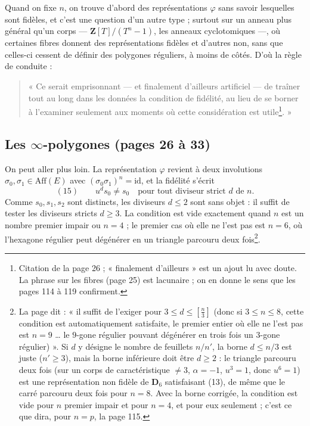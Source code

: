 \documentclass[11pt,a4paper]{article}
\begin{document}
Quand on fixe $n$, on trouve d'abord des représentations $\varphi$ sans savoir
lesquelles sont fidèles, et c'est une question d'un autre type ; surtout sur
un anneau plus général qu'un corps --- $\mathbf{Z}[T]/(T^n - 1)$, les anneaux
cyclotomiques ---, où certaines fibres donnent des représentations fidèles et
d'autres non, sans que celles-ci cessent de définir des polygones réguliers,
à moins de côtés. D'où la règle de conduite :
\begin{quote}
« Ce serait emprisonnant --- et finalement d'ailleurs artificiel --- de
traîner tout au long dans les données la condition de fidélité, au lieu de se
borner à l'examiner seulement aux moments où cette considération est
utile\footnote{Citation de la page 26 ; « finalement d'ailleurs » est un
ajout lu avec doute. La phrase sur les fibres (page 25) est lacunaire ; on en
donne le sens que les pages 114 à 119 confirment.}. »
\end{quote}

\subsection*{Les $\infty$-polygones (pages 26 à 33)}

On peut aller plus loin. La représentation $\varphi$ revient à deux
involutions $\sigma_0, \sigma_1 \in \mathrm{Aff}(E)$ avec $(\sigma_0
\sigma_1)^n = \mathrm{id}$, et la fidélité s'écrit
\[
  (15) \qquad u^d s_0 \neq s_0 \quad \text{pour tout diviseur strict } d
  \text{ de } n .
\]
Comme $s_0, s_1, s_2$ sont distincts, les diviseurs $d \leq 2$ sont sans
objet : il suffit de tester les diviseurs stricts $d \geq 3$. La condition
est vide exactement quand $n$ est un nombre premier impair ou $n = 4$ ; le
premier cas où elle ne l'est pas est $n = 6$, où l'hexagone régulier peut
dégénérer en un triangle parcouru deux fois\footnote{La page dit : « il
suffit de l'exiger pour $3 \leq d \leq [\frac n3]$ (donc si $3 \leq n \leq 8$,
cette condition est automatiquement satisfaite, le premier entier où elle ne
l'est pas est $n = 9$ \ldots{} le $9$-gone régulier pouvant dégénérer en trois
fois un $3$-gone régulier) ». Si $d$ y désigne le nombre de feuillets
$n/n'$, la borne $d \leq n/3$ est juste ($n' \geq 3$), mais la borne
inférieure doit être $d \geq 2$ : le triangle parcouru deux fois (sur un corps
de caractéristique $\neq 3$, $\alpha = -1$, $u^3 = 1$, donc $u^6 = 1$) est
une représentation non fidèle de $\mathbf{D}_6$ satisfaisant (13), de même
que le carré parcouru deux fois pour $n = 8$. Avec la borne corrigée, la
condition est vide pour $n$ premier impair et pour $n = 4$, et pour eux
seulement ; c'est ce que dira, pour $n = p$, la page 115.}.
\end{document}
